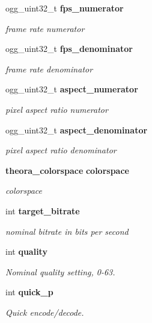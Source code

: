 \begin{DoxyCompactItemize}
ogg\_\-uint32\_\-t {\bf fps\_\-numerator}
\begin{DoxyCompactList}\small\item\em frame rate numerator \item\end{DoxyCompactList}\item 
ogg\_\-uint32\_\-t {\bf fps\_\-denominator}
\begin{DoxyCompactList}\small\item\em frame rate denominator \item\end{DoxyCompactList}\item 
ogg\_\-uint32\_\-t {\bf aspect\_\-numerator}
\begin{DoxyCompactList}\small\item\em pixel aspect ratio numerator \item\end{DoxyCompactList}\item 
ogg\_\-uint32\_\-t {\bf aspect\_\-denominator}
\begin{DoxyCompactList}\small\item\em pixel aspect ratio denominator \item\end{DoxyCompactList}\item 
{\bf theora\_\-colorspace} {\bf colorspace}
\begin{DoxyCompactList}\small\item\em colorspace \item\end{DoxyCompactList}\item 
int {\bf target\_\-bitrate}
\begin{DoxyCompactList}\small\item\em nominal bitrate in bits per second \item\end{DoxyCompactList}\item 
int {\bf quality}
\begin{DoxyCompactList}\small\item\em Nominal quality setting, 0-\/63. \item\end{DoxyCompactList}\item 
int {\bf quick\_\-p}
\begin{DoxyCompactList}\small\item\em Quick encode/decode. \item\end{DoxyCompactList}\item 

\end{DoxyCompactItemize}
